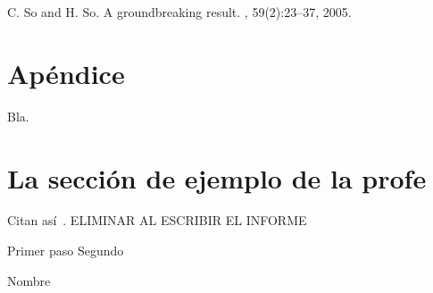 \documentclass{ci5652}
\begin{document}
\begin{thebibliography}{99}

C. So and H. So.
\newblock A groundbreaking result.
, 59(2):23--37, 2005.

\end{thebibliography}


\newpage
\section*{Apéndice}

Bla.


\section{La sección de ejemplo de la profe}
Citan así~\cite{so2005}. ELIMINAR AL ESCRIBIR EL INFORME

\begin{algorithm}
 \DontPrintSemicolon
 \vspace*{0.1cm}
 Primer paso\;
 Segundo\;
 \vspace*{0.1cm}
 \caption{Nombre}
\end{algorithm}
\end{document}
